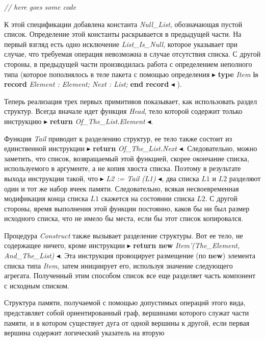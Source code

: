 \documentclass{../../template/mai_book}
\begin{document}

\textit{// here goes some code} \newline

К этой спецификации добавлена константа \textit{Null\_List}, обозначающая пустой список. Определение этой константы раскрывается в предыдущей части. На первый взгляд есть одно исключение \textit{List\_Is\_Null}, которое указывает при случае, что требуемая операция невозможна в случае отсутствия списка. С другой стороны, в предыдущей части производилась работа с определением неполного типа (которое пополнялось в теле пакета с помощью определения $\blacktriangleright$ \textbf{type} \textit{Item} \textbf{is record} \textit{Element : Element; Next : List;} \textbf{end record} $\blacktriangleleft$ ).

Теперь реализация трех первых примитивов показывает, как использовать раздел структур. Всегда вначале идет функция \textit{Head}, тело которой содержит только инструкцию $\blacktriangleright$ \textbf{return} \textit{Of\_The\_List.Element} $\blacktriangleleft$.

Функция \textit{Tail} приводит к разделению структур, ее тело также состоит из единственной инструкции $\blacktriangleright$ \textbf{return} \textit{Of\_The\_List.Next} $\blacktriangleleft$. Следовательно, можно заметить, что список, возвращаемый этой функцией, скорее окончание списка, используемого в аргументе, а не копия хвоста списка. Поэтому в результате выхода инструкции такой, что $\blacktriangleright$ \textit{L2 := Tail (L1)} $\blacktriangleleft$, два списка $L1$ и $L2$ разделяют один и тот же набор ячеек памяти. Следовательно, всякая несвоевременная модификация конца списка $L1$ скажется на состоянии списка $L2$. С другой стороны, время выполнения этой функции постоянно, каков бы ни был размер исходного списка, что не имело бы места, если бы этот список копировался.

Процедура \textit{Construct} также вызывает разделение структуры. Вот ее тело, не содержащее ничего, кроме инструкции $\blacktriangleright$ \textbf{return new} \textit{Item'(\linebreak The\_Element, And\_The\_List)} $\blacktriangleleft$. Эта инструкция провоцирует размещение (по \textbf{new}) элемента списка типа \textit{Item}, затем инициирует его, используя значение следующего агрегата. Полученный этим способом список все еще разделяет часть компонент с исходным списком.

Структура памяти, получаемой с помощью допустимых операций этого вида, представляет собой ориентированный граф, вершинами которого служат части памяти, и в котором существует дуга от одной вершины к другой, если первая вершина содержит логический указатель на вторую \linebreak
\end{document}
